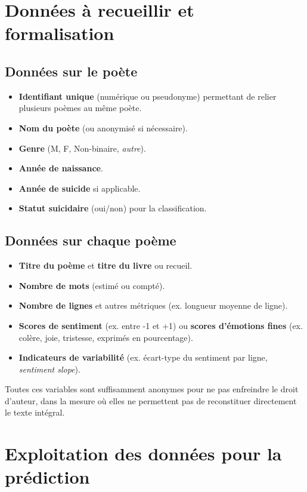 \documentclass[12pt,a4paper]{article}
\begin{document}
\section{Données à recueillir et formalisation}

\subsection{Données sur le poète}

\begin{itemize}
    \item \textbf{Identifiant unique} (numérique ou pseudonyme) permettant 
    de relier plusieurs poèmes au même poète.
    \item \textbf{Nom du poète} (ou anonymisé si nécessaire).
    \item \textbf{Genre} (M, F, Non-binaire, \textit{autre}).
    \item \textbf{Année de naissance}. 
    \item \textbf{Année de suicide} si applicable. 
    \item \textbf{Statut suicidaire} (oui/non) pour la classification.
\end{itemize}

\subsection{Données sur chaque poème}

\begin{itemize}
    \item \textbf{Titre du poème} et \textbf{titre du livre} ou recueil.
    \item \textbf{Nombre de mots} (estimé ou compté).
    \item \textbf{Nombre de lignes} et autres métriques (ex. longueur moyenne 
    de ligne).
    \item \textbf{Scores de sentiment} (ex. entre -1 et +1) 
    ou \textbf{scores d'émotions fines} (ex. colère, joie, tristesse, 
    exprimés en pourcentage).
    \item \textbf{Indicateurs de variabilité} (ex. écart-type du sentiment 
    par ligne, \textit{sentiment slope}).
\end{itemize}

Toutes ces variables sont suffisamment anonymes pour ne pas 
enfreindre le droit d'auteur, dans la mesure où elles ne permettent 
pas de reconstituer directement le texte intégral.

\section{Exploitation des données pour la prédiction}
\end{document}
